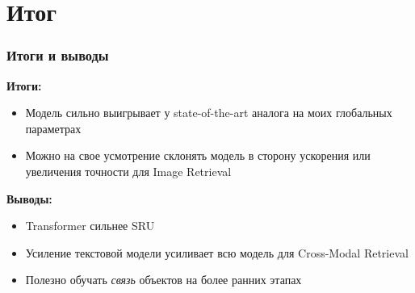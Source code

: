 \documentclass{beamer}
\begin{document}
\section{Итог}

\begin{frame}
	\frametitle{Итоги и выводы}
	\textbf{Итоги:}
	\begin{itemize}
		\item 
		Модель сильно выигрывает у state-of-the-art аналога на моих глобальных параметрах
		
		\item
		Можно на свое усмотрение склонять модель в сторону ускорения или увеличения точности для Image Retrieval
	\end{itemize}
	
	\textbf{Выводы:}
	\begin{itemize}
		\item
		Transformer сильнее SRU
		
		\item
		Усиление текстовой модели усиливает всю модель для Cross-Modal Retrieval
		
		\item
		Полезно обучать \textit{связь} объектов на более ранних этапах
	\end{itemize}
\end{frame}

\appendix
\end{document}
